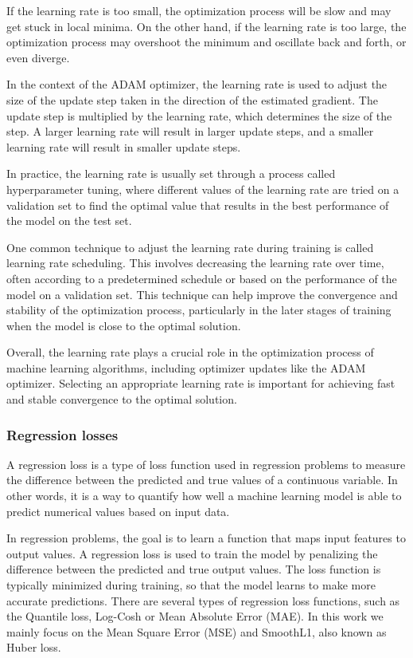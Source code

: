If the learning rate is too small, the optimization process will be slow and may get stuck in local minima. On the other hand, if the learning rate is too large, the optimization process may overshoot the minimum and oscillate back and forth, or even diverge.

In the context of the ADAM optimizer, the learning rate is used to adjust the size of the update step taken in the direction of the estimated gradient. The update step is multiplied by the learning rate, which determines the size of the step. A larger learning rate will result in larger update steps, and a smaller learning rate will result in smaller update steps.

In practice, the learning rate is usually set through a process called hyperparameter tuning, where different values of the learning rate are tried on a validation set to find the optimal value that results in the best performance of the model on the test set.

One common technique to adjust the learning rate during training is called learning rate scheduling. This involves decreasing the learning rate over time, often according to a predetermined schedule or based on the performance of the model on a validation set. This technique can help improve the convergence and stability of the optimization process, particularly in the later stages of training when the model is close to the optimal solution.

Overall, the learning rate plays a crucial role in the optimization process of machine learning algorithms, including optimizer updates like the ADAM optimizer. Selecting an appropriate learning rate is important for achieving fast and stable convergence to the optimal solution.

\subsubsection{Regression losses}
\label{subsec:3_regression_losses}


A regression loss is a type of loss function used in regression problems to measure the difference between the predicted and true values of a continuous variable. In other words, it is a way to quantify how well a machine learning model is able to predict numerical values based on input data.

In regression problems, the goal is to learn a function that maps input features to output values. A regression loss is used to train the model by penalizing the difference between the predicted and true output values. The loss function is typically minimized during training, so that the model learns to make more accurate predictions. There are several types of regression loss functions, such as the Quantile loss, Log-Cosh or Mean Absolute Error (MAE). In this work we mainly focus on the Mean Square Error (MSE) and SmoothL1, also known as Huber loss.

